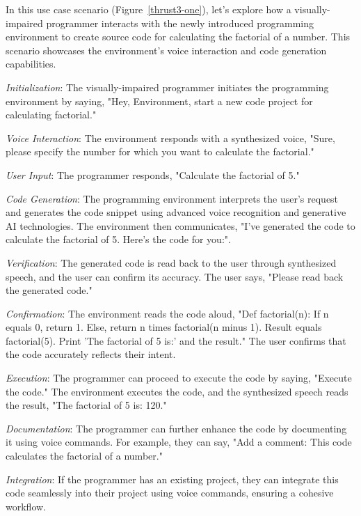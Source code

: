 In this use case scenario (Figure~\ref{thrust3-one}), let's explore
how a visually-impaired programmer interacts with the newly introduced
programming environment to create source code for calculating the
factorial of a number. This scenario showcases the environment's voice
interaction and code generation capabilities.

{\em Initialization}: The visually-impaired programmer initiates the
programming environment by saying, "Hey, Environment, start a new code
project for calculating factorial."

{\em Voice Interaction}: The environment responds with a synthesized voice,
"Sure, please specify the number for which you want to calculate the
factorial."

{\em User Input}: The programmer responds, "Calculate the factorial of 5."

{\em Code Generation}: The programming environment interprets the user's
request and generates the code snippet using advanced voice
recognition and generative AI technologies.  The environment then
communicates, "I've generated the code to calculate the factorial of
5. Here's the code for you:".

{\em Verification}: The generated code is read back to the user through synthesized speech, and the user can confirm its accuracy.
The user says, "Please read back the generated code."

{\em Confirmation}: The environment reads the code aloud, "Def factorial(n): If n equals 0, return 1. Else, return n times factorial(n minus 1). Result equals factorial(5). Print 'The factorial of 5 is:' and the result." The user confirms that the code accurately reflects their intent.

{\em Execution}: The programmer can proceed to execute the code by saying, "Execute the code." The environment executes the code, and the synthesized speech reads the result, "The factorial of 5 is: 120."

{\em Documentation}: The programmer can further enhance the code by documenting it using voice commands. For example, they can say, "Add a comment: This code calculates the factorial of a number."

{\em Integration}: If the programmer has an existing project, they can
integrate this code seamlessly into their project using voice
commands, ensuring a cohesive workflow.
